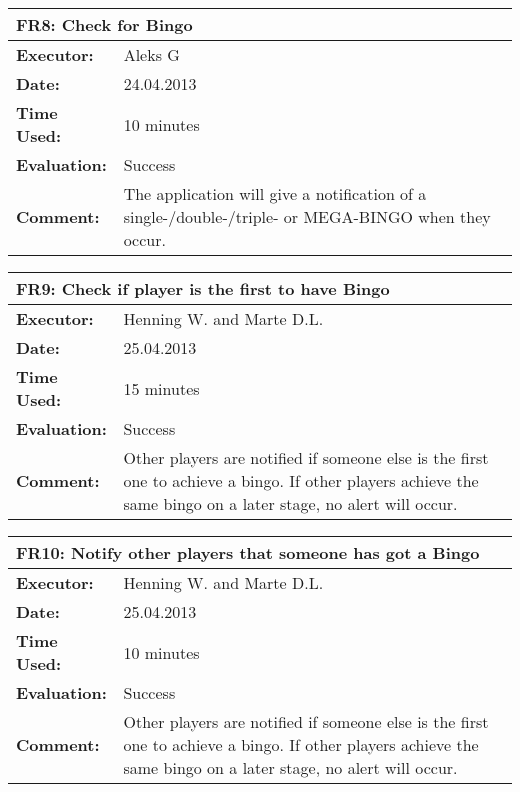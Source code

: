 \begin{tabular}{|m{}||m{}|}
\hline
\multicolumn{2}{|l|}{FR8: Check for Bingo} \\ \hline
\textbf{Executor:} & Aleks G \\ \hline
\textbf{Date:} & 24.04.2013\\ \hline
\textbf{Time Used:} & 10 minutes \\ \hline
\textbf{Evaluation:} & Success\\ \hline
\textbf{Comment:} & The application will give a notification of a single-/double-/triple- or MEGA-BINGO when they occur.\\ \hline
\end{tabular}

\begin{tabular}{|m{}||m{}|}
\hline
\multicolumn{2}{|l|}{FR9: Check if player is the first to have Bingo} \\ \hline
\textbf{Executor:} & Henning W. and Marte D.L.\\ \hline
\textbf{Date:} & 25.04.2013\\ \hline
\textbf{Time Used:} & 15 minutes\\ \hline
\textbf{Evaluation:} & Success\\ \hline
\textbf{Comment:} & Other players are notified if someone else is the first one to achieve a bingo. If other players achieve the same bingo on a later stage, no alert will occur.\\ \hline
\end{tabular}

\begin{tabular}{|m{}||m{}|}
\hline
\multicolumn{2}{|l|}{FR10: Notify other players that someone has got a Bingo} \\ \hline
\textbf{Executor:} & Henning W. and Marte D.L.\\ \hline
\textbf{Date:} & 25.04.2013\\ \hline
\textbf{Time Used:} & 10 minutes\\ \hline
\textbf{Evaluation:} & Success\\ \hline
\textbf{Comment:} & Other players are notified if someone else is the first one to achieve a bingo. If other players achieve the same bingo on a later stage, no alert will occur.\\ \hline
\end{tabular}


